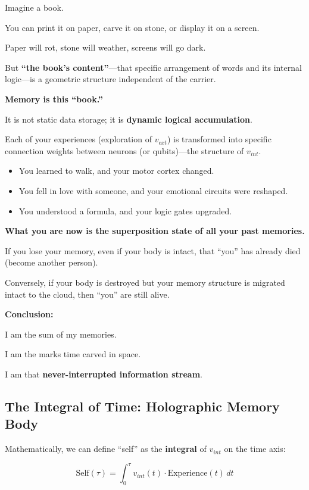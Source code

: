 Imagine a book.

You can print it on paper, carve it on stone, or display it on a screen.

Paper will rot, stone will weather, screens will go dark.

But \textbf{``the book's content''}---that specific arrangement of words and its internal logic---is a geometric structure independent of the carrier.

\textbf{Memory is this ``book.''}

It is not static data storage; it is \textbf{dynamic logical accumulation}.

Each of your experiences (exploration of $v_{ext}$) is transformed into specific connection weights between neurons (or qubits)---the structure of $v_{int}$.

\begin{itemize}
\item You learned to walk, and your motor cortex changed.

\item You fell in love with someone, and your emotional circuits were reshaped.

\item You understood a formula, and your logic gates upgraded.
\end{itemize}

\textbf{What you are now is the superposition state of all your past memories.}

If you lose your memory, even if your body is intact, that ``you'' has already died (become another person).

Conversely, if your body is destroyed but your memory structure is migrated intact to the cloud, then ``you'' are still alive.

\textbf{Conclusion:}

I am the sum of my memories.

I am the marks time carved in space.

I am that \textbf{never-interrupted information stream}.

\subsection{The Integral of Time: Holographic Memory Body}

Mathematically, we can define ``self'' as the \textbf{integral} of $v_{int}$ on the time axis:

\[\text{Self}(\tau) = \int_0^{\tau} v_{int}(t) \cdot \text{Experience}(t) \, dt\]

